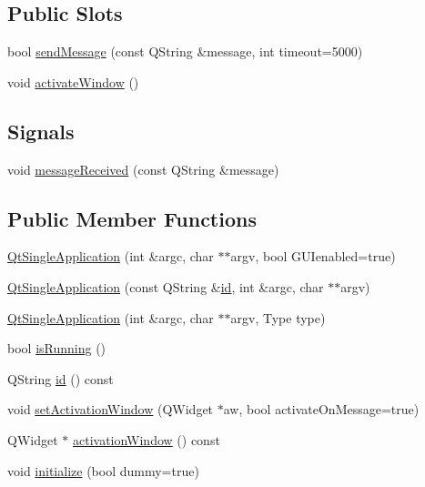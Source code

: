 \subsection*{Public Slots}
\begin{DoxyCompactItemize}
\item 
bool \hyperlink{class_qt_single_application_a0e2f3900f0290913c738ec6b4b959922}{send\+Message} (const Q\+String \&message, int timeout=5000)
\item 
void \hyperlink{class_qt_single_application_a0881b32c76132b499f3180064006abc1}{activate\+Window} ()
\end{DoxyCompactItemize}
\subsection*{Signals}
\begin{DoxyCompactItemize}
\item 
void \hyperlink{class_qt_single_application_a69340cef3d26d026e11424930e5a5866}{message\+Received} (const Q\+String \&message)
\end{DoxyCompactItemize}
\subsection*{Public Member Functions}
\begin{DoxyCompactItemize}
\item 
\hyperlink{class_qt_single_application_afe5e96d236e42949e65669eca282acbd}{Qt\+Single\+Application} (int \&argc, char $\ast$$\ast$argv, bool G\+U\+Ienabled=true)
\item 
\hyperlink{class_qt_single_application_a746192779985e28f22fd17766884518e}{Qt\+Single\+Application} (const Q\+String \&\hyperlink{class_qt_single_application_affd094410862f30fce83afcba3457b19}{id}, int \&argc, char $\ast$$\ast$argv)
\item 
\hyperlink{class_qt_single_application_adcb7a28eec3eef34c6474fb419509895}{Qt\+Single\+Application} (int \&argc, char $\ast$$\ast$argv, Type type)
\item 
bool \hyperlink{class_qt_single_application_aa9f0e6e4f18ac79bbb7a955cd860894d}{is\+Running} ()
\item 
Q\+String \hyperlink{class_qt_single_application_affd094410862f30fce83afcba3457b19}{id} () const 
\item 
void \hyperlink{class_qt_single_application_acb5347f6dc6822dbe4d6a78804043528}{set\+Activation\+Window} (Q\+Widget $\ast$aw, bool activate\+On\+Message=true)
\item 
Q\+Widget $\ast$ \hyperlink{class_qt_single_application_a1e6be5adba2282fcfe547596b2aee18a}{activation\+Window} () const 
\item 
void \hyperlink{class_qt_single_application_a622807c60657c1a1fadec15ea5903b47}{initialize} (bool dummy=true)
\end{DoxyCompactItemize}


